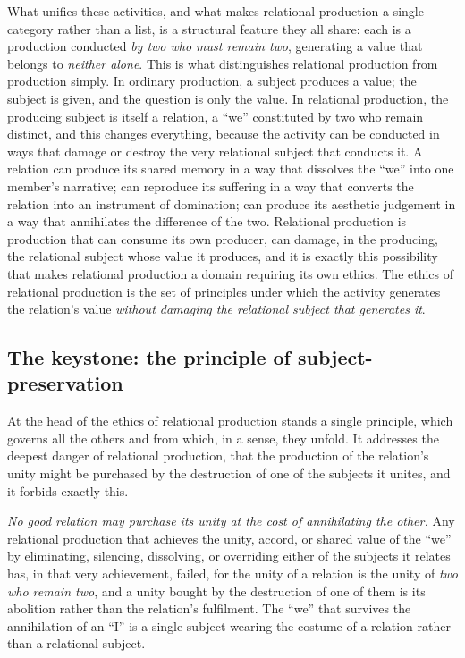 What unifies these activities, and what makes relational production a single category rather than a list, is a structural feature they all share: each is a production conducted \emph{by two who must remain two}, generating a value that belongs to \emph{neither alone}. This is what distinguishes relational production from production simply. In ordinary production, a subject produces a value; the subject is given, and the question is only the value. In relational production, the producing subject is itself a relation, a ``we'' constituted by two who remain distinct, and this changes everything, because the activity can be conducted in ways that damage or destroy the very relational subject that conducts it. A relation can produce its shared memory in a way that dissolves the ``we'' into one member's narrative; can reproduce its suffering in a way that converts the relation into an instrument of domination; can produce its aesthetic judgement in a way that annihilates the difference of the two. Relational production is production that can consume its own producer, can damage, in the producing, the relational subject whose value it produces, and it is exactly this possibility that makes relational production a domain requiring its own ethics. The ethics of relational production is the set of principles under which the activity generates the relation's value \emph{without damaging the relational subject that generates it}.

\subsection{The keystone: the principle of subject-preservation}
\label{p21:sub:rp-subjectpreservation}

At the head of the ethics of relational production stands a single principle, which governs all the others and from which, in a sense, they unfold. It addresses the deepest danger of relational production, that the production of the relation's unity might be purchased by the destruction of one of the subjects it unites, and it forbids exactly this.

\begin{definitionbox}
\emph{No good relation may purchase its unity at the cost of annihilating the other.} Any relational production that achieves the unity, accord, or shared value of the ``we'' by eliminating, silencing, dissolving, or overriding either of the subjects it relates has, in that very achievement, failed, for the unity of a relation is the unity of \emph{two who remain two}, and a unity bought by the destruction of one of them is its abolition rather than the relation's fulfilment. The ``we'' that survives the annihilation of an ``I'' is a single subject wearing the costume of a relation rather than a relational subject.
\end{definitionbox}

